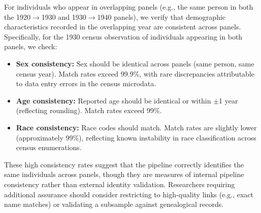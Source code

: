 \documentclass[12pt]{article}
\begin{document}
For individuals who appear in overlapping panels (e.g., the same person in both the 1920$\rightarrow$1930 and 1930$\rightarrow$1940 panels), we verify that demographic characteristics recorded in the overlapping year are consistent across panels. Specifically, for the 1930 census observation of individuals appearing in both panels, we check:

\begin{itemize}
\item \textbf{Sex consistency:} Sex should be identical across panels (same person, same census year). Match rates exceed 99.9\%, with rare discrepancies attributable to data entry errors in the census microdata.

\item \textbf{Age consistency:} Reported age should be identical or within $\pm$1 year (reflecting rounding). Match rates exceed 99\%.

\item \textbf{Race consistency:} Race codes should match. Match rates are slightly lower (approximately 99\%), reflecting known instability in race classification across census enumerations.
\end{itemize}

These high consistency rates suggest that the pipeline correctly identifies the same individuals across panels, though they are measures of internal pipeline consistency rather than external identity validation. Researchers requiring additional assurance should consider restricting to high-quality links (e.g., exact name matches) or validating a subsample against genealogical records.
\end{document}
